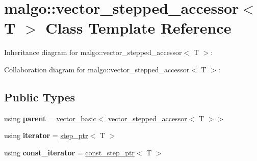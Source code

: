 \hypertarget{classmalgo_1_1vector__stepped__accessor}{}\section{malgo\+:\+:vector\+\_\+stepped\+\_\+accessor$<$ T $>$ Class Template Reference}
\label{classmalgo_1_1vector__stepped__accessor}


Inheritance diagram for malgo\+:\+:vector\+\_\+stepped\+\_\+accessor$<$ T $>$\+:


Collaboration diagram for malgo\+:\+:vector\+\_\+stepped\+\_\+accessor$<$ T $>$\+:
\subsection*{Public Types}
\begin{DoxyCompactItemize}
\item 
using {\bfseries parent} = \hyperlink{classmalgo_1_1vector__basic}{vector\+\_\+basic}$<$ \hyperlink{classmalgo_1_1vector__stepped__accessor}{vector\+\_\+stepped\+\_\+accessor}$<$ T $>$$>$\hypertarget{classmalgo_1_1vector__stepped__accessor_ac26bb6a426d51acf68a4fefb37a4ed47}{}\label{classmalgo_1_1vector__stepped__accessor_ac26bb6a426d51acf68a4fefb37a4ed47}

\item 
using {\bfseries iterator} = \hyperlink{structmalgo_1_1step__ptr}{step\+\_\+ptr}$<$ T $>$\hypertarget{classmalgo_1_1vector__stepped__accessor_ac08cca8844487f98be943f3471dafa20}{}\label{classmalgo_1_1vector__stepped__accessor_ac08cca8844487f98be943f3471dafa20}

\item 
using {\bfseries const\+\_\+iterator} = \hyperlink{structmalgo_1_1const__step__ptr}{const\+\_\+step\+\_\+ptr}$<$ T $>$\hypertarget{classmalgo_1_1vector__stepped__accessor_abfe15bbe52e977409b03c1baae153600}{}\label{classmalgo_1_1vector__stepped__accessor_abfe15bbe52e977409b03c1baae153600}

\end{DoxyCompactItemize}
